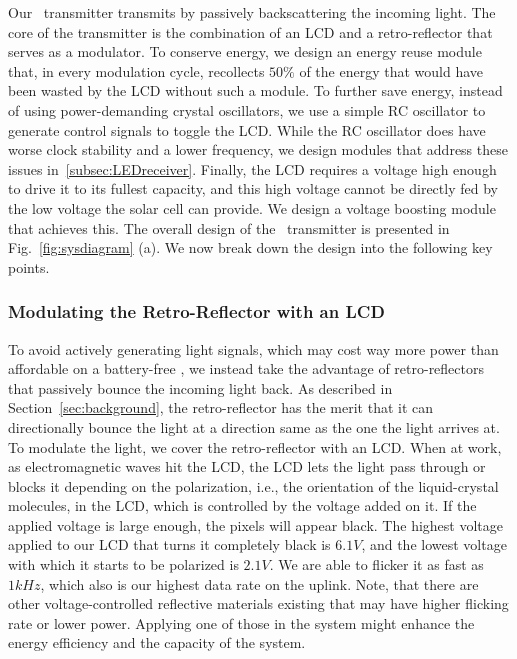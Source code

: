 Our \vitag\ transmitter transmits by passively backscattering the incoming light. The core of the transmitter is the combination of an LCD and a retro-reflector that serves as a modulator. To conserve energy, we design an energy reuse module that, in every modulation cycle, recollects $50\%$ of the energy that would have been wasted by the LCD without such a module. To further save energy, instead of using power-demanding crystal oscillators, we use a simple RC oscillator to generate control signals to toggle the LCD. While the RC oscillator does have worse clock stability and a lower frequency, we design modules that address these issues in~\ref{subsec:LEDreceiver}. Finally, the LCD requires a voltage high enough to drive it to its fullest capacity, and this high voltage cannot be directly fed by the low voltage the solar cell can provide. We design a voltage boosting module that achieves this. The overall design of the \vitag\ transmitter is presented in Fig.~\ref{fig:sysdiagram} (a). We now break down the design into the following key points.

\subsubsection{Modulating the Retro-Reflector with an LCD}
To avoid actively generating light signals, which may cost way more power than affordable on a battery-free \vitag, we instead take the advantage of retro-reflectors that passively bounce the incoming light back. As described in Section~\ref{sec:background}, the retro-reflector has the merit that it can directionally bounce the light at a direction same as the one the light arrives at. To modulate the light, we cover the retro-reflector with an LCD. When at work, as electromagnetic waves hit the LCD, the LCD lets the light pass through or blocks it depending on the polarization, i.e., the orientation of the liquid-crystal molecules, in the LCD, which is controlled by the voltage added on it. If the applied voltage is large enough, the pixels will appear black. The highest voltage applied to our LCD that turns it completely black is $6.1V$, and the lowest voltage with which it starts to be polarized is $2.1V$. We are able to flicker it as fast as $1kHz$, which also is our highest data rate on the uplink. Note, that there are other voltage-controlled reflective materials existing that may have higher flicking rate or lower power. Applying one of those in the system might enhance the energy efficiency and the capacity of the system.  

